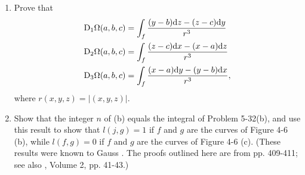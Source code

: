\begin{problems}
{\begin{enumerate}[label=(\alph*)]
                exists, even if $f$ is knotted, see [6], page 138.) Suppose that whenever $g$ 
                intersects $M$ at $x$ the tangent vector $v$ of $g$ is not in $M_x$·
                Let $n^+$ be the number of intersections where $v$ points in the same direction as 
                the outward normal and $n^-$ the number of other intersections. If $n=n^+ - n^-$ show that
                \begin{align*}
                  n=\frac{-1}{4\pi}\int_{g}\;\dd\Omega.
                \end{align*}
            \item Prove that 
                \begin{align*}
                  \mathrm{D}_{1}\Omega(a,b,c) & = \int_{f}\frac{(y-b)\mathrm{d} z-(z-c)\mathrm{d} y}{r^{3}} \\
                  \mathrm{D}_{2}\Omega(a,b,c) & = \int_{f}\frac{(z-c)\mathrm{d} x-(x-a)\mathrm{d} z}{r^{3}} \\
                  \mathrm{D}_{3}\Omega(a,b,c) & = \int_{f}\frac{(x-a)\mathrm{d} y-(y-b)\mathrm{d} x}{r^{3}},
                \end{align*}
                where $r(x,y,z)=|(x,y,z)|$.
            \item Show that the integer $n$ of (b) equals the integral of Problem 5-32(b), 
                and use this result to show that $l(j,g) = 1$ if $f$ and $g$ are the curves 
                of Figure 4-6 (b), while $l(f,g) = 0$ if $f$ and $g$ are the curves of Figure 4-6 (c). 
                (These results were known to Gauss \cite{gaussNachlass}. The proofs outlined here 
                are from \cite{courant1937differential} pp. 409-411; see also \cite{maxwell1954electricity}, 
                Volume 2, pp. 41-43.)
        \end{enumerate}
    }
\end{problems}